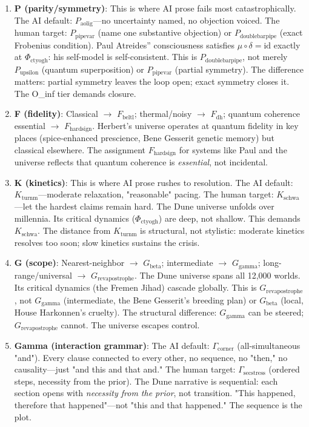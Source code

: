 \documentclass[12pt,a4paper]{article}
\begin{document}
\begin{enumerate}
    \item \textbf{P (parity/symmetry)}: This is where AI prose fails most catastrophically. The AI default: $P_{\text{aolig}}$---no uncertainty named, no objection voiced. The human target: $P_{\text{pipevar}}$ (name one substantive objection) or $P_{\text{doublebarpipe}}$ (exact Frobenius condition). Paul Atreides'' consciousness satisfies $\mu \circ \delta = \text{id}$ exactly at $\Phi_{\text{ctyogh}}$: his self-model is self-consistent. This is $P_{\text{doublebarpipe}}$, not merely $P_{\text{upsilon}}$ (quantum superposition) or $P_{\text{pipevar}}$ (partial symmetry). The difference matters: partial symmetry leaves the loop open; exact symmetry closes it. The O\_inf tier demands closure.
    \item \textbf{F (fidelity)}: Classical $\rightarrow$ $F_{\text{beltl}}$; thermal/noisy $\rightarrow$ $F_{\text{dh}}$; quantum coherence essential $\rightarrow$ $F_{\text{hardsign}}$. Herbert's universe operates at quantum fidelity in key places (spice-enhanced prescience, Bene Gesserit genetic memory) but classical elsewhere. The assignment $F_{\text{hardsign}}$ for systems like Paul and the universe reflects that quantum coherence is \emph{essential}, not incidental.
    \item \textbf{K (kinetics)}: This is where AI prose rushes to resolution. The AI default: $K_{\text{turnm}}$---moderate relaxation, "reasonable" pacing. The human target: $K_{\text{schwa}}$---let the hardest claims remain hard. The Dune universe unfolds over millennia. Its critical dynamics ($\Phi_{\text{ctyogh}}$) are deep, not shallow. This demands $K_{\text{schwa}}$. The distance from $K_{\text{turnm}}$ is structural, not stylistic: moderate kinetics resolves too soon; slow kinetics sustains the crisis.
    \item \textbf{G (scope)}: Nearest-neighbor $\rightarrow$ $G_{\text{beta}}$; intermediate $\rightarrow$ $G_{\text{gamma}}$; long-range/universal $\rightarrow$ $G_{\text{revapostrophe}}$. The Dune universe spans all 12,000 worlds. Its critical dynamics (the Fremen Jihad) cascade globally. This is $G_{\text{revapostrophe}}$, not $G_{\text{gamma}}$ (intermediate, the Bene Gesserit's breeding plan) or $G_{\text{beta}}$ (local, House Harkonnen's cruelty). The structural difference: $G_{\text{gamma}}$ can be steered; $G_{\text{revapostrophe}}$ cannot. The universe escapes control.
    \item \textbf{Gamma (interaction grammar)}: The AI default: $\Gamma_{\text{corner}}$ (all-simultaneous "and"). Every clause connected to every other, no sequence, no "then," no causality---just "and this and that and." The human target: $\Gamma_{\text{secstress}}$ (ordered steps, necessity from the prior). The Dune narrative is sequential: each section opens with \emph{necessity from the prior}, not transition. "This happened, therefore that happened"---not "this and that happened." The sequence is the plot.

\end{enumerate}
\end{document}
